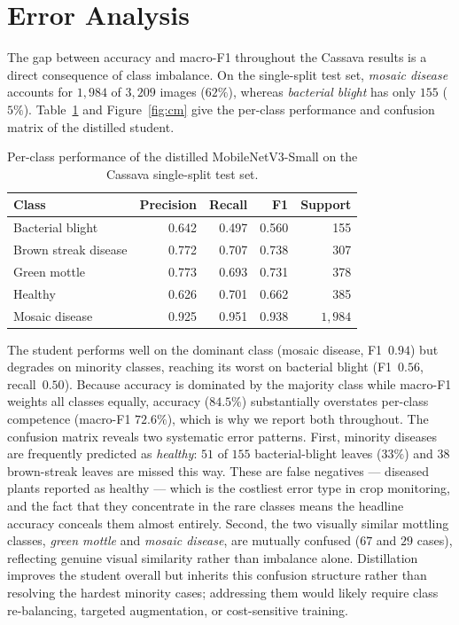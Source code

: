 \documentclass[conference]{IEEEtran}
\begin{document}
\section{Error Analysis}

The gap between accuracy and macro-F1 throughout the Cassava results is a
direct consequence of class imbalance. On the single-split test set,
\emph{mosaic disease} accounts for $1{,}984$ of $3{,}209$ images ($62\%$),
whereas \emph{bacterial blight} has only $155$ ($5\%$).
Table~\ref{tab:perclass} and Figure~\ref{fig:cm} give the per-class performance
and confusion matrix of the distilled student.

\begin{table}
  \centering
  \caption{Per-class performance of the distilled MobileNetV3-Small on the
  Cassava single-split test set.}
  \label{tab:perclass}
  \begin{tabular}{lrrrr}
    \toprule
    Class & Precision & Recall & F1 & Support \\
    \midrule
    Bacterial blight    & 0.642 & 0.497 & 0.560 &     155 \\
    Brown streak disease & 0.772 & 0.707 & 0.738 &     307 \\
    Green mottle        & 0.773 & 0.693 & 0.731 &     378 \\
    Healthy             & 0.626 & 0.701 & 0.662 &     385 \\
    Mosaic disease      & 0.925 & 0.951 & 0.938 & $1{,}984$ \\
    \bottomrule
  \end{tabular}
\end{table}

The student performs well on the dominant class (mosaic disease, F1~$0.94$) but
degrades on minority classes, reaching its worst on bacterial blight
(F1~$0.56$, recall~$0.50$). Because accuracy is dominated by the majority class
while macro-F1 weights all classes equally, accuracy ($84.5\%$) substantially
overstates per-class competence (macro-F1 $72.6\%$), which is why we report both
throughout. The confusion matrix reveals two systematic error patterns. First,
minority diseases are frequently predicted as \emph{healthy}: $51$ of $155$
bacterial-blight leaves ($33\%$) and $38$ brown-streak leaves are missed this
way. These are false negatives --- diseased plants reported as healthy --- which
is the costliest error type in crop monitoring, and the fact that they
concentrate in the rare classes means the headline accuracy conceals them
almost entirely. Second, the two visually similar mottling classes, \emph{green
mottle} and \emph{mosaic disease}, are mutually confused ($67$ and $29$ cases),
reflecting genuine visual similarity rather than imbalance alone. Distillation
improves the student overall but inherits this confusion structure rather than
resolving the hardest minority cases; addressing them would likely require class
re-balancing, targeted augmentation, or cost-sensitive training.
\end{document}

